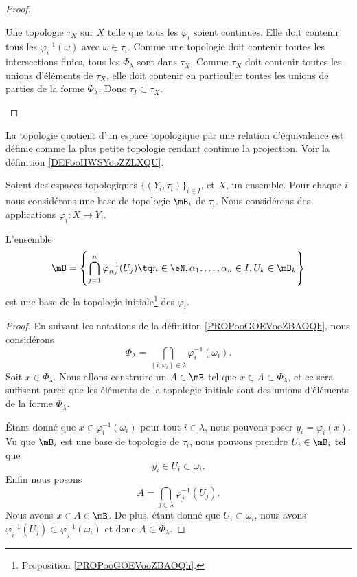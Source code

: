 \begin{proof}
\begin{subproof}
		Une topologie \( \tau_X\) sur \( X\) telle que tous les \( \varphi_i\) soient continues. Elle doit contenir tous les \( \varphi_i^{-1}(\omega)\) avec \( \omega\in \tau_i\). Comme une topologie doit contenir toutes les intersections finies, tous les \( \Phi_{\lambda}\) sont dans \( \tau_X\). Comme \( \tau_X\) doit contenir toutes les unions d'éléments de \( \tau_X\), elle doit contenir en particulier toutes les unions de parties de la forme \( \Phi_{\lambda}\). Donc \( \tau_I\subset\tau_X\).
	\end{subproof}
\end{proof}

La topologie quotient d'un espace topologique par une relation d'équivalence est définie comme la plus petite topologie rendant continue la projection. Voir la définition \ref{DEFooHWSYooZZLXQU}.

\begin{lemma}     \label{LEMooVRGFooNgbwKu}
	Soient des espaces topologiques \( \{ (Y_i,\tau_i) \}_{i\in I}\), et \( X\), un ensemble. Pour chaque \( i\) nous considérons une base de topologie \( \mB_i\) de \( \tau_i\). Nous considérons des applications \( \varphi_i\colon X\to Y_i\).

	L'ensemble
	\begin{equation}
		\mB=\left\{ \bigcap_{j=1}^n \varphi^{-1}_{\alpha_j}(U_j)\tq n\in \eN,\alpha_1,\ldots,\alpha_n\in I,U_k\in \mB_k \right\}
	\end{equation}
	est une base de la topologie initiale\footnote{Proposition \ref{PROPooGOEVooZBAOQh}.} des \( \varphi_i\).
\end{lemma}

\begin{proof}
	En suivant les notations de la définition \ref{PROPooGOEVooZBAOQh}, nous considérons
	\begin{equation}
		\Phi_{\lambda}=\bigcap_{(i,\omega_i)\in \lambda}\varphi_i^{-1}(\omega_i).
	\end{equation}
	Soit \( x\in \Phi_{\lambda}\). Nous allons construire un \( A\in\mB\) tel que \( x\in A\subset\Phi_{\lambda}\), et ce sera suffisant parce que les éléments de la topologie initiale sont des unions d'éléments de la forme \( \Phi_{\lambda}\).

	Étant donné que \( x\in\varphi_i^{-1}(\omega_i)\) pour tout \( i\in\lambda\), nous pouvons poser \( y_i=\varphi_i(x)\). Vu que \( \mB_i\) est une base de topologie de \( \tau_i\), nous pouvons prendre \( U_i\in\mB_i\) tel que
	\begin{equation}
		y_i\in  U_i\subset\omega_i.
	\end{equation}
	Enfin nous posons
	\begin{equation}
		A=\bigcap_{j\in\lambda}\varphi_j^{-1}(U_j).
	\end{equation}
	Nous avons \( x\in A\in\mB\). De plus, étant donné que \( U_i\subset \omega_i\), nous avons \( \varphi_i^{-1}(U_j)\subset\varphi_j^{-1}(\omega_i)\) et donc \( A\subset\Phi_{\lambda}\).
\end{proof}


